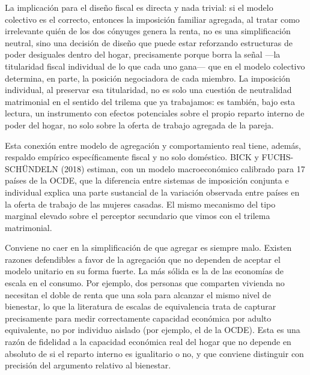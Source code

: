 \documentclass[10pt,a4paper]{article}
\begin{document}
La implicación para el diseño fiscal es directa y nada trivial: si el modelo colectivo es el correcto, entonces la imposición familiar agregada, al tratar como irrelevante quién de los dos cónyuges genera la renta, no es una simplificación neutral, sino una decisión de diseño que puede estar reforzando estructuras de poder desiguales dentro del hogar, precisamente porque borra la señal —la titularidad fiscal individual de lo que cada uno gana— que en el modelo colectivo determina, en parte, la posición negociadora de cada miembro. La imposición individual, al preservar esa titularidad, no es solo una cuestión de neutralidad matrimonial en el sentido del trilema que ya trabajamos: es también, bajo esta lectura, un instrumento con efectos potenciales sobre el propio reparto interno de poder del hogar, no solo sobre la oferta de trabajo agregada de la pareja.

Esta conexión entre modelo de agregación y comportamiento real tiene, además, respaldo empírico específicamente fiscal y no solo doméstico. BICK y FUCHS-SCHÜNDELN (2018) estiman, con un modelo macroeconómico calibrado para 17 países de la OCDE, que la diferencia entre sistemas de imposición conjunta e individual explica una parte sustancial de la variación observada entre países en la oferta de trabajo de las mujeres casadas. El mismo mecanismo del tipo marginal elevado sobre el perceptor secundario que vimos con el trilema matrimonial.

Conviene no caer en la simplificación de que agregar es siempre malo. Existen razones defendibles a favor de la agregación que no dependen de aceptar el modelo unitario en su forma fuerte. La más sólida es la de las economías de escala en el consumo. Por ejemplo, dos personas que comparten vivienda no necesitan el doble de renta que una sola para alcanzar el mismo nivel de bienestar, lo que la literatura de escalas de equivalencia trata de capturar precisamente para medir correctamente capacidad económica por adulto equivalente, no por individuo aislado (por ejemplo, el de la OCDE). Esta es una razón de fidelidad a la capacidad económica real del hogar que no depende en absoluto de si el reparto interno es igualitario o no, y que conviene distinguir con precisión del argumento relativo al bienestar.
\end{document}
